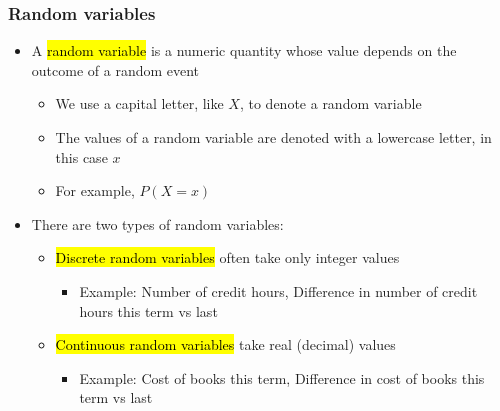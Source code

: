 \documentclass[slidestop,compress,mathserif]{beamer}
\begin{document}

\begin{frame}
\frametitle{Random variables}

\begin{itemize}

\item A \hl{random variable} is a numeric quantity whose value depends on the outcome of a random event
\begin{itemize}
\item We use a capital letter, like $X$, to denote a random variable
\item The values of a random variable are denoted with a lowercase letter, in this case $x$
\item For example, $P(X = x)$
\end{itemize}

\item There are two types of random variables:
\begin{itemize}
\item \hl{Discrete random variables} often take only integer values
\begin{itemize}
\item Example: Number of credit hours, Difference in number of credit hours this term vs last
\end{itemize}
\item \hl{Continuous random variables} take real (decimal) values
\begin{itemize}
\item Example: Cost of books this term, Difference in cost of books this term vs last
\end{itemize}
\end{itemize}

\end{itemize}

\end{frame}

\end{document}
